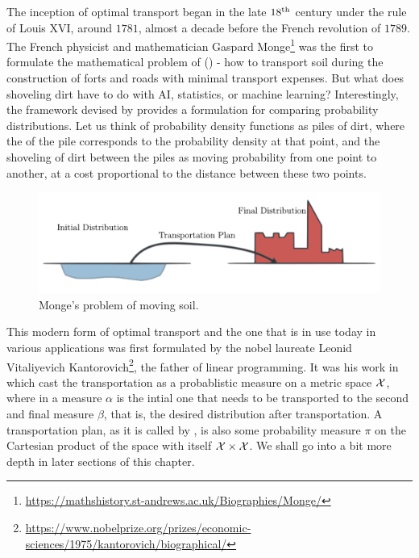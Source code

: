 The inception of optimal transport began in the late $18\textsuperscript{th}$ century under the rule of Louis \RN{16}, around $1781$, almost a decade before the French revolution of $1789$. The French physicist and mathematician Gaspard Monge\footnote{\url{https://mathshistory.st-andrews.ac.uk/Biographies/Monge/}} was the first to formulate the mathematical problem of  () - how to transport soil during the construction of forts and roads with minimal transport expenses. But what does shoveling dirt have to do with AI, statistics, or machine learning? Interestingly, the framework devised by \citeauthor{monge1781memoire} provides a formulation for comparing probability distributions.
Let us think of probability density functions as piles of dirt, where the  of the pile corresponds to the probability density at that point, and the shoveling of dirt between the piles as moving probability from one point to another, at a cost proportional to the distance between these two points.

\begin{figure}[ht]
    \centering
    \includegraphics[width=\linewidth]{chapters/assets/ot/monge.pdf}
    \caption{Monge's problem of moving soil.}
    \label{fig:monges-problem}
\end{figure}

This modern form of optimal transport and the one that is in use today in various applications was first formulated by the nobel laureate Leonid Vitaliyevich Kantorovich\footnote{\url{https://www.nobelprize.org/prizes/economic-sciences/1975/kantorovich/biographical/}}, the father of linear programming. 
It was his work in \citeyear{Kantorovich42} which cast the transportation as a probablistic measure on a metric space $\mathcal{X}$, where in a measure $\alpha$ is the intial one that needs to be transported to the second and final measure $\beta$, that is, the desired distribution after transportation. A transportation plan, as it is called by \citeauthor{Kantorovich42}, is also some probability measure $\pi$ on the Cartesian product of the space with itself $\mathcal{X} \times \mathcal{X}$.
We shall go into a bit more depth in later sections of this chapter.

